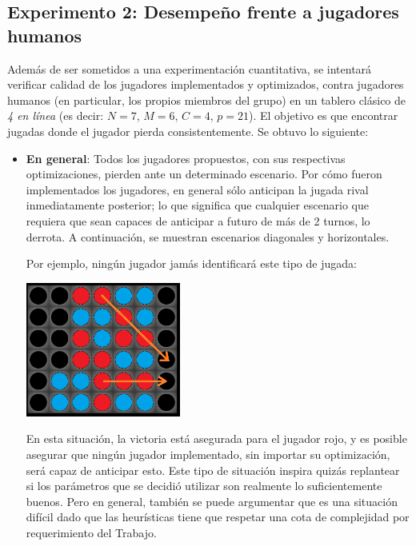 \documentclass[12pt,a4paper]{article}
\begin{document}
    
    
    \subsection{Experimento 2: Desempeño frente a jugadores humanos}

    Además de ser sometidos a una experimentación cuantitativa, se intentará verificar calidad de los jugadores implementados y optimizados, contra jugadores humanos (en particular, los propios miembros del grupo) en un tablero clásico de \textit{4 en línea} (es decir: $N=7$, $M=6$, $C=4$, $p=21$). El objetivo es que encontrar jugadas donde el jugador pierda consistentemente. Se obtuvo lo siguiente:
    
    \begin{itemize}
                \item \textbf{En general}: Todos los jugadores propuestos, con sus respectivas optimizaciones, pierden ante un determinado escenario. Por cómo fueron implementados los jugadores, en general sólo anticipan la jugada rival inmediatamente posterior; lo que significa que cualquier escenario que requiera que sean capaces de anticipar a futuro de más de 2 turnos, lo derrota. A continuación, se muestran escenarios diagonales y horizontales.
                
                Por ejemplo, ningún jugador jamás identificará este tipo de jugada:
                
                \begin{center}
                \includegraphics[width=0.4\textwidth]{tablero2turnosfuturo.png}
                \end{center}
                
                En esta situación, la victoria está asegurada para el jugador rojo, y es posible asegurar que ningún jugador implementado, sin importar su optimización, será capaz de anticipar esto. Este tipo de situación inspira quizás replantear si los parámetros que se decidió utilizar son realmente lo suficientemente buenos. Pero en general, también se puede argumentar que es una situación difícil dado que las heurísticas tiene que respetar una cota de complejidad por requerimiento del Trabajo.
                

\end{itemize}
\end{document}
